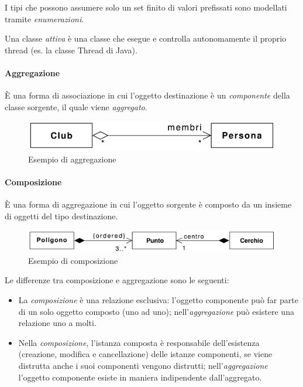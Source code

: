 I tipi che possono assumere solo un set finito di valori prefissati sono modellati tramite \textit{enumerazioni}. 

Una classe \textit{attiva} è una classe che esegue e controlla autonomamente il proprio thread (es. la classe Thread di Java).

\paragraph{Aggregazione} È una forma di associazione in cui l'oggetto destinazione è un \textit{componente} della classe sorgente, il quale viene \textit{aggregato}.

\begin{figure}[H]
    \centering
    \includegraphics[width=0.6\linewidth]{assets/UML/class/class-6.png}
    \caption{Esempio di aggregazione}
\end{figure}

\paragraph{Composizione} È una forma di aggregazione in cui l'oggetto sorgente è composto da un insieme di oggetti del tipo destinazione.

\begin{figure}[H]
    \centering
    \includegraphics[width=0.8\linewidth]{assets/UML/class/class-7.png}
    \caption{Esempio di composizione}
\end{figure}
Le differenze tra composizione e aggregazione sono le seguenti:
\begin{itemize}
    \item La \textit{composizione} è una relazione esclusiva: l'oggetto componente può far parte di un solo oggetto composto (uno ad uno); nell'\textit{aggregazione} può esistere una relazione uno a molti.
    \item Nella \textit{composizione}, l'istanza composta è responsabile dell'esistenza (creazione, modifica e cancellazione) delle istanze componenti, se viene distrutta anche i suoi componenti vengono distrutti; nell'\textit{aggregazione} l'oggetto componente esiste in maniera indipendente dall'aggregato.
\end{itemize}

